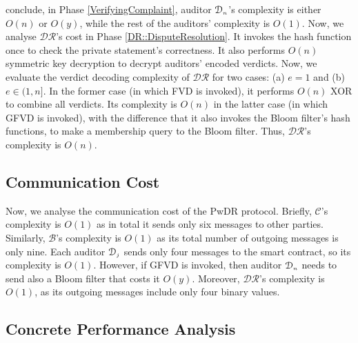 conclude, in Phase \ref{VerifyingComplaint},  auditor $\mathcal{D}_{\scriptscriptstyle n}$'s complexity is either $O(n)$ or $O(y)$, while the rest of  the auditors' complexity is $O(1)$. Now, we analyse $\mathcal{DR}$'s cost in Phase \ref{DR::DisputeResolution}. It invokes the hash function once to check the private statement's correctness. It also performs $O(n)$ symmetric key decryption to decrypt auditors' encoded verdicts. Now, we evaluate the verdict decoding complexity of $\mathcal{DR}$ 
for two cases: (a) $e = 1$ and (b) $e \in (1, n]$. In the former case (in which  FVD is invoked), it performs $O(n)$ XOR to combine all verdicts. Its complexity is $O(n)$ in the latter case (in which  GFVD is invoked), with the difference that it also invokes the Bloom filter's hash functions, to make a membership query to the Bloom filter.  Thus, $\mathcal{DR}$'s complexity is $O(n)$. 


\subsection{Communication Cost} Now, we analyse the communication cost of the PwDR protocol. Briefly, $\mathcal{C}$'s complexity is $O(1)$ as in total it sends only six messages to other parties. Similarly, $\mathcal{B}$'s complexity is $O(1)$ as its total number of outgoing messages is only nine. Each auditor $\mathcal{D}_{\scriptscriptstyle j}$ sends only four messages to the smart contract, so its complexity is $O(1)$. However, if GFVD is invoked, then auditor $\mathcal{D}_{\scriptscriptstyle n}$ needs to send also a Bloom filter that costs it $O(y)$. Moreover, $\mathcal{DR}$'s complexity is $O(1)$, as its outgoing messages include only four binary values. 




\vspace{-1mm}
\subsection{Concrete Performance Analysis}

